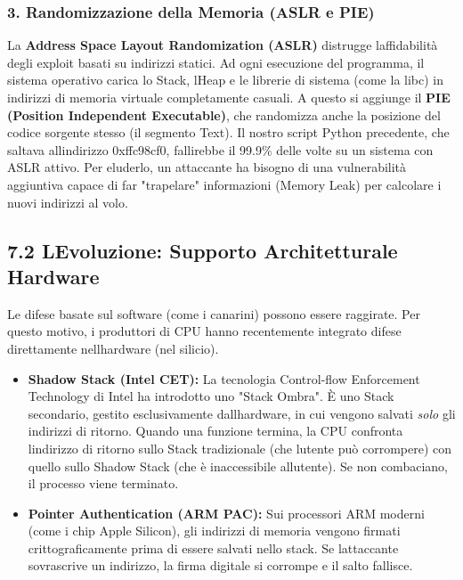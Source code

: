 \documentclass[11pt,a4paper]{article}
\begin{document}
\subsubsection{3. Randomizzazione della Memoria (ASLR e
PIE)}\label{randomizzazione-della-memoria-aslr-e-pie}

La \textbf{Address Space Layout Randomization (ASLR)} distrugge
l\textquotesingle affidabilità degli exploit basati su indirizzi
statici. Ad ogni esecuzione del programma, il sistema operativo carica
lo Stack, l\textquotesingle Heap e le librerie di sistema (come la libc)
in indirizzi di memoria virtuale completamente casuali. A questo si
aggiunge il \textbf{PIE (Position Independent Executable)}, che
randomizza anche la posizione del codice sorgente stesso (il segmento
Text). Il nostro script Python precedente, che saltava
all\textquotesingle indirizzo 0xffc98cf0, fallirebbe il 99.9\% delle
volte su un sistema con ASLR attivo. Per eluderlo, un attaccante ha
bisogno di una vulnerabilità aggiuntiva capace di far "trapelare"
informazioni (Memory Leak) per calcolare i nuovi indirizzi al volo.

\subsection{7.2 L\textquotesingle Evoluzione: Supporto Architetturale
Hardware}\label{levoluzione-supporto-architetturale-hardware}

Le difese basate sul software (come i canarini) possono essere
raggirate. Per questo motivo, i produttori di CPU hanno recentemente
integrato difese direttamente nell\textquotesingle hardware (nel
silicio).

\begin{itemize}
\item
  \textbf{Shadow Stack (Intel CET):} La tecnologia Control-flow
  Enforcement Technology di Intel ha introdotto uno "Stack Ombra". È uno
  Stack secondario, gestito esclusivamente
  dall\textquotesingle hardware, in cui vengono salvati \emph{solo} gli
  indirizzi di ritorno. Quando una funzione termina, la CPU confronta
  l\textquotesingle indirizzo di ritorno sullo Stack tradizionale (che
  l\textquotesingle utente può corrompere) con quello sullo Shadow Stack
  (che è inaccessibile all\textquotesingle utente). Se non combaciano,
  il processo viene terminato.
\item
  \textbf{Pointer Authentication (ARM PAC):} Sui processori ARM moderni
  (come i chip Apple Silicon), gli indirizzi di memoria vengono firmati
  crittograficamente prima di essere salvati nello stack. Se
  l\textquotesingle attaccante sovrascrive un indirizzo, la firma
  digitale si corrompe e il salto fallisce.
\end{itemize}
\end{document}
